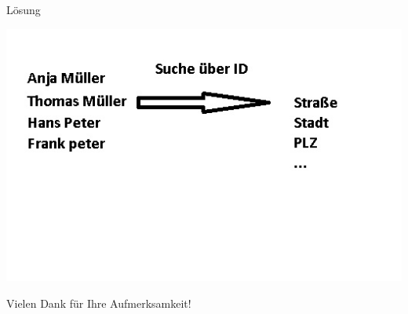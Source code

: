 \documentclass[xcolor={usenames,dvipsnames}, compress, 10pt]{beamer}
\begin{document}
\subsection*{}

\begin{frame}{Lösung}
\begin{center}


\includegraphics[width=\textheight]{Bilder/presi2.jpg} 

\end{center}
\end{frame}





\begin{frame}
\begin{center}
Vielen Dank f\"ur Ihre Aufmerksamkeit!
\end{center}
\end{frame}
\end{document}

